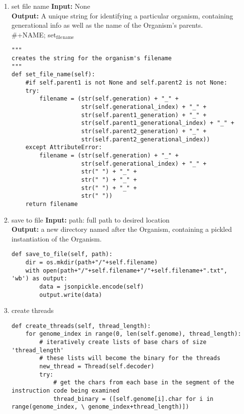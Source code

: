 \documentclass[a4paper]{article}
\begin{document}
\begin{enumerate}
\item set file name
\label{sec-7-3-1-1}
\textbf{Input:}  None\\
\textbf{Output:} A unique string for identifying a particular organism, containing generational info as well as the name of the Organism’s parents.\\
\#+NAME; set$_{\text{file}}$$_{\text{name}}$
\begin{verbatim}
"""
creates the string for the organism's filename
"""
def set_file_name(self):
    #if self.parent1 is not None and self.parent2 is not None:
    try:
        filename = (str(self.generation) + "_" +
                    str(self.generational_index) + "_" +
                    str(self.parent1_generation) + "_" +
                    str(self.parent1_generational_index) + "_" +
                    str(self.parent2_generation) + "_" +
                    str(self.parent2_generational_index))
    except AttributeError:
        filename = (str(self.generation) + "_" +
                    str(self.generational_index) + "_" +
                    str(" ") + "_" +
                    str(" ") + "_" +
                    str(" ") + "_" +
                    str(" "))
    return filename
\end{verbatim}
\item save to file
\label{sec-7-3-1-2}
\textbf{Input:} path: full path to desired location\\
\textbf{Output:} a new directory named after the Organism, containing a pickled instantiation of the Organism. \\
\begin{verbatim}
def save_to_file(self, path):
    dir = os.mkdir(path+"/"+self.filename)
    with open(path+"/"+self.filename+"/"+self.filename+".txt", 'wb') as output:
        data = jsonpickle.encode(self)
        output.write(data)
\end{verbatim}
\item create threads
\label{sec-7-3-1-3}
\begin{verbatim}
def create_threads(self, thread_length):
    for genome_index in range(0, len(self.genome), thread_length):
        # iteratively create lists of base chars of size 'thread_length'
        # these lists will become the binary for the threads
        new_thread = Thread(self.decoder)
        try:
            # get the chars from each base in the segment of the instruction code being examined
            thread_binary = ([self.genome[i].char for i in range(genome_index, \ genome_index+thread_length)])

\end{verbatim}$$
\end{enumerate}
\end{document}
